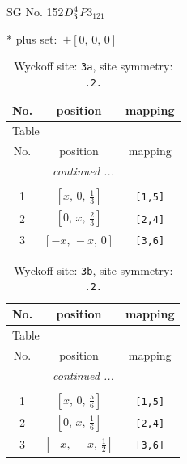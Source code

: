 \documentclass[fleqn,8pt]{jsarticle}
\begin{document}
\setcounter{MaxMatrixCols}{32}

\renewcommand{\tablename}{Table~}
\renewcommand{\figurename}{Figure~}
\begin{center}
\LARGE
SG No. 152\quad$D_{\rm 3}^{4}$\quad$P3_121$\quad[ trigonal ]
\end{center}
* plus set:\,\,\,$+\left[ 0,\, 0,\, 0 \right]$
\renewcommand{\arraystretch}{1.2}
\begin{longtable}{ccc}
\caption{Wyckoff site: {\tt 3a}, site symmetry: {\tt .2.}}
 \\
 \hline \hline
No. & position & mapping \\ \hline \endfirsthead

\multicolumn{2}{l}{\tablename\ \thetable{}} \\
 \hline \hline
No. & position & mapping \\ \hline \endhead

 \hline \hline
\multicolumn{2}{r}{\footnotesize\it continued ...} \\ \endfoot

 \hline \hline
\multicolumn{2}{r}{} \\ \endlastfoot

1 & $\left[ x,\, 0,\, \frac{1}{3} \right]$ & {\tt [1,5]} \\ \hline
2 & $\left[ 0,\, x,\, \frac{2}{3} \right]$ & {\tt [2,4]} \\ \hline
3 & $\left[ - x,\, - x,\, 0 \right]$ & {\tt [3,6]} \\
\end{longtable}
\renewcommand{\arraystretch}{1.2}
\begin{longtable}{ccc}
\caption{Wyckoff site: {\tt 3b}, site symmetry: {\tt .2.}}
 \\
 \hline \hline
No. & position & mapping \\ \hline \endfirsthead

\multicolumn{2}{l}{\tablename\ \thetable{}} \\
 \hline \hline
No. & position & mapping \\ \hline \endhead

 \hline \hline
\multicolumn{2}{r}{\footnotesize\it continued ...} \\ \endfoot

 \hline \hline
\multicolumn{2}{r}{} \\ \endlastfoot

1 & $\left[ x,\, 0,\, \frac{5}{6} \right]$ & {\tt [1,5]} \\ \hline
2 & $\left[ 0,\, x,\, \frac{1}{6} \right]$ & {\tt [2,4]} \\ \hline
3 & $\left[ - x,\, - x,\, \frac{1}{2} \right]$ & {\tt [3,6]} \\
\end{longtable}
\end{document}

